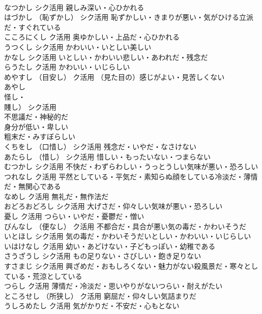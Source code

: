 \documentclass[8pt]{extreport}
\begin{document}
\begin{CJK}{UTF8}{min}
\\	なつかし		シク活用	親しみ深い・心ひかれる
\\	はづかし	（恥ずかし）	シク活用	恥ずかしい・きまりが悪い・気がひける立派だ・すぐれている
\\	こころにくし		ク活用	奥ゆかしい・上品だ・心ひかれる
\\	うつくし		シク活用	かわいい・いとしい美しい
\\	かなし		シク活用	いとしい・かわいい悲しい・あわれだ・残念だ
\\	らうたし		ク活用	かわいい・いじらしい
\\	めやすし	（目安し）	ク活用	（見た目の）感じがよい・見苦しくない
\\	あやし	
\\	怪し・
\\	賤し）	シク活用	
\\	不思議だ・神秘的だ
\\	身分が低い・卑しい
\\	粗末だ・みすぼらしい
\\	くちをし	（口惜し）	シク活用	残念だ・いやだ・なさけない
\\	あたらし	（惜し）	シク活用	惜しい・もったいない・つまらない
\\	むつかし		シク活用	不快だ・わずらわしい・うっとうしい気味が悪い・恐ろしい
\\	つれなし		ク活用	平然としている・平気だ・素知らぬ顔をしている冷淡だ・薄情だ・無関心である
\\	なめし		ク活用	無礼だ・無作法だ
\\	おどろおどろし		シク活用	大げさだ・仰々しい気味が悪い・恐ろしい
\\	憂し		ク活用	つらい・いやだ・憂鬱だ・憎い
\\	びんなし	（便なし）	ク活用	不都合だ・具合が悪い気の毒だ・かわいそうだ
\\	いとほし		シク活用	気の毒だ・かわいそうだいとしい・かわいい・いじらしい
\\	いはけなし		ク活用	幼い・あどけない・子どもっぽい・幼稚である
\\	さうざうし		シク活用	もの足りない・さびしい・飽き足りない
\\	すさまじ		シク活用	興ざめだ・おもしろくない・魅力がない殺風景だ・寒々としている・荒涼としている
\\	つらし		ク活用	薄情だ・冷淡だ・思いやりがないつらい・耐えがたい
\\	ところせし	（所狭し）	ク活用	窮屈だ・仰々しい気詰まりだ
\\	うしろめたし		ク活用	気がかりだ・不安だ・心もとない

\end{CJK}
\end{document}
